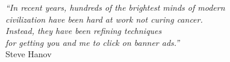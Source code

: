 \cleardoublepage
\thispagestyle{plain}

\vspace*{8cm}


\begin{flushright}
    \textsl{``In recent years, hundreds of the brightest minds of modern \\
        civilization have been hard at work not curing cancer. \\
         Instead, they have been refining techniques \\
         for getting you and me to click on banner ads.''} \\
    \vspace*{1.5cm}
    Steve Hanov
\end{flushright}
